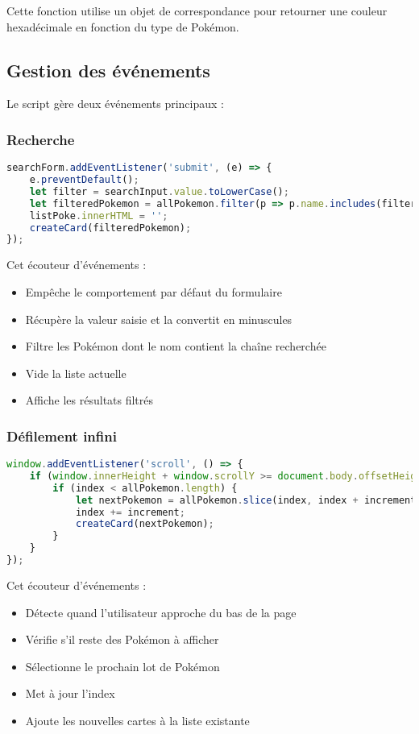 \documentclass{article}
\begin{document}
Cette fonction utilise un objet de correspondance pour retourner une couleur hexadécimale en fonction du type de Pokémon.

\subsection{Gestion des événements}
Le script gère deux événements principaux :

\subsubsection{Recherche}
\begin{lstlisting}[language=JavaScript]
searchForm.addEventListener('submit', (e) => {
    e.preventDefault();
    let filter = searchInput.value.toLowerCase();
    let filteredPokemon = allPokemon.filter(p => p.name.includes(filter));
    listPoke.innerHTML = '';
    createCard(filteredPokemon);
});
\end{lstlisting}

Cet écouteur d'événements :
\begin{itemize}
    \item Empêche le comportement par défaut du formulaire
    \item Récupère la valeur saisie et la convertit en minuscules
    \item Filtre les Pokémon dont le nom contient la chaîne recherchée
    \item Vide la liste actuelle
    \item Affiche les résultats filtrés
\end{itemize}

\subsubsection{Défilement infini}
\begin{lstlisting}[language=JavaScript]
window.addEventListener('scroll', () => {
    if (window.innerHeight + window.scrollY >= document.body.offsetHeight - 50) {
        if (index < allPokemon.length) {
            let nextPokemon = allPokemon.slice(index, index + increment);
            index += increment;
            createCard(nextPokemon);
        }
    }
});
\end{lstlisting}

Cet écouteur d'événements :
\begin{itemize}
    \item Détecte quand l'utilisateur approche du bas de la page
    \item Vérifie s'il reste des Pokémon à afficher
    \item Sélectionne le prochain lot de Pokémon
    \item Met à jour l'index
    \item Ajoute les nouvelles cartes à la liste existante
\end{itemize}
\end{document}
